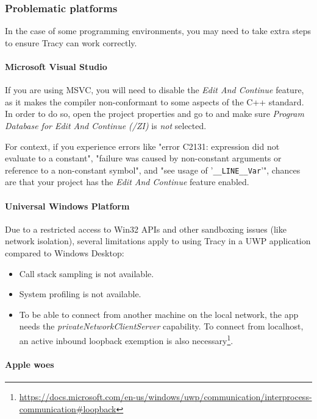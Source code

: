 \documentclass[hidelinks,titlepage,a4paper,twoside]{article}
\begin{document}
\subsubsection{Problematic platforms}

In the case of some programming environments, you may need to take extra steps to ensure Tracy can work correctly.

\paragraph{Microsoft Visual Studio}

If you are using MSVC, you will need to disable the \emph{Edit And Continue} feature, as it makes the compiler non-conformant to some aspects of the C++ standard. In order to do so, open the project properties and go to  and make sure \emph{Program Database for Edit And Continue (/ZI)} is \emph{not} selected.

For context, if you experience errors like "error C2131: expression did not evaluate to a constant", "failure was caused by non-constant arguments or reference to a non-constant symbol", and "see usage of '\texttt{\_\_LINE\_\_Var}'", chances are that your project has the \emph{Edit And Continue} feature enabled.

\paragraph{Universal Windows Platform}

Due to a restricted access to Win32 APIs and other sandboxing issues (like network isolation), several limitations apply to using Tracy in a UWP application compared to Windows Desktop:

\begin{itemize}
\item Call stack sampling is not available.
\item System profiling is not available.
\item To be able to connect from another machine on the local network, the app needs the \emph{privateNetworkClientServer} capability. To connect from localhost, an active inbound loopback exemption is also necessary\footnote{\url{https://docs.microsoft.com/en-us/windows/uwp/communication/interprocess-communication\#loopback}}.
\end{itemize}

\paragraph{Apple woes}
\end{document}

